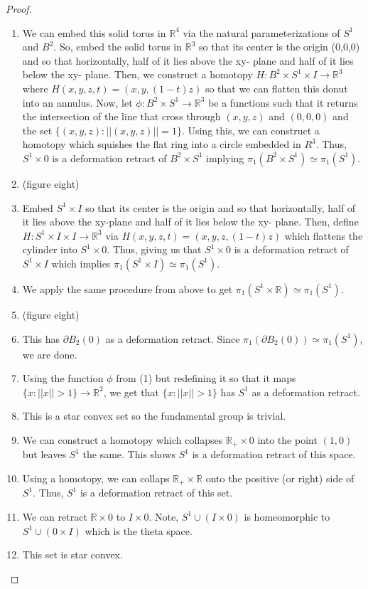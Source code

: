\documentclass{article}
\begin{document}
\begin{proof}
	\begin{enumerate}
		\item We can embed this solid torus in $\mathbb{R}^4$ via the natural parameterizations of $S^1$ and $B^2$. So, embed the solid torus in $\mathbb{R}^3$ so that
		its center is the origin (0,0,0) and so that horizontally, half of it lies above the xy- plane and half of it lies below the xy- plane. Then, we construct
		a homotopy $H: B^2\times S^1 \times I \to \mathbb{R}^3$ where $H(x,y,z,t) = (x,y,(1-t)z)$ so that we can flatten this donut into an annulus. Now,
		let $\phi: B^2\times S^1 \to \mathbb{R}^3$ be a functions such that it returns the intersection of the line that cross through $(x,y,z)$ and $(0,0,0)$ and the
		set $\{(x,y,z): ||(x,y,z)|| = 1\}$. Using this, we can construct a homotopy which squishes the flat ring into a circle embedded in $R^3$. Thus, $S^1\times 0$ is a
		deformation retract of $B^2\times S^1$ implying $\pi_1(B^2\times S^1) \simeq \pi_1(S^1)$.
		\item (figure eight)
		\item Embed $S^1\times I$ so that its center is the origin and so that horizontally, half of it lies above the xy-plane and half of it lies below the xy- plane.
		Then, define $H: S^1\times I \times I \to \mathbb{R}^3$ via $H(x,y,z,t) = (x,y,z,(1-t)z)$ which flattens the cylinder into $S^1\times 0$. Thus, giving us that
		$S^1\times 0$ is a deformation retract of $S^1\times I$ which implies $\pi_1(S^1\times I)\simeq \pi_1(S^1)$.
		\item We apply the same procedure from above to get $\pi_1(S^1\times \mathbb{R}) \simeq \pi_1(S^1)$.
		\item (figure eight) 
		\item This has $\partial B_2(0)$ as a deformation retract. Since $\pi_1(\partial B_2(0)) \simeq \pi_1(S^1)$, we are done.
		\item Using the function $\phi$ from (1) but redefining it so that it maps $\{x: ||x||>1\}\to \mathbb{R}^2$, we get that $\{x: ||x||>1\}$ has $S^1$ as a deformation retract.
		\item This is a star convex set so the fundamental group is trivial.
		\item We can construct a homotopy which collapses $\mathbb{R}_+ \times 0$ into the point $(1,0)$ but leaves $S^1$ the same. This shows $S^1$ is a deformation retract
		of this space.
		\item Using a homotopy, we can collaps $\mathbb{R}_+ \times \mathbb{R}$ onto the positive (or right) side of $S^1$. Thus, $S^1$ is a deformation retract of this set.
		\item We can retract $\mathbb{R}\times 0$ to $I \times 0$. Note, $S^1 \cup (I \times 0)$ is homeomorphic to $S^1 \cup (0 \times I)$ which is the theta space.
		\item This set is star convex.
	\end{enumerate}
\end{proof}
\end{document}
